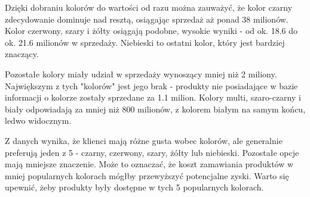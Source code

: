 \documentclass[a4paper,12pt]{article}
\begin{document}
Dzięki dobraniu kolorów do wartości od razu można zauważyć, że kolor czarny zdecydowanie dominuje nad resztą, osiągając sprzedaż aż ponad 38 milionów. Kolor czerwony, szary i żółty osiągają podobne, wysokie wyniki - od ok. 18.6 do ok. 21.6 milionów w sprzedaży. Niebieski to ostatni kolor, który jest bardziej znaczący.

Pozostałe kolory miały udział w sprzedaży wynoszący mniej niż 2 miliony. Największym z tych "kolorów" jest jego brak - produkty nie posiadające w bazie informacji o kolorze zostały sprzedane za 1.1 milion. Kolory multi, szaro-czarny i biały odpowiadają za mniej niż 800 milionów, z kolorem białym na samym końcu, ledwo widocznym.

Z danych wynika, że klienci mają różne gusta wobec kolorów, ale generalnie preferują jeden z 5 - czarny, czerwony, szary, żółty lub niebieski. Pozostałe opcje mają mniejsze znaczenie. Może to oznaczać, że koszt zamawiania produktów w mniej popularnych kolorach mógłby przewyższyć potencjalne zyski. Warto się upewnić, żeby produkty były dostępne w tych 5 popularnych kolorach.

\printbibliography
\end{document}
